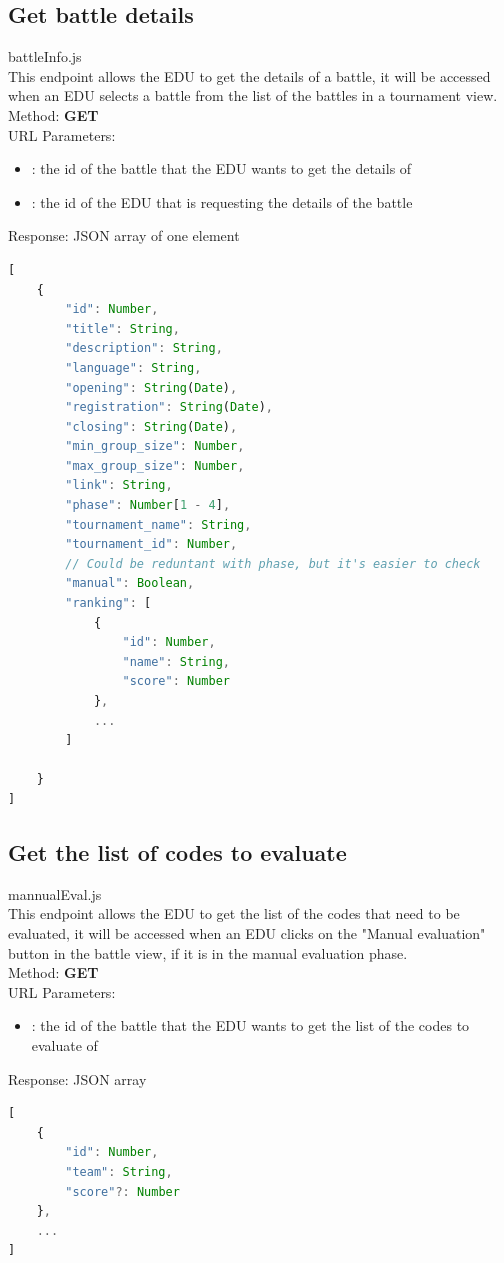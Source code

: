 \subsection{Get battle details}
battleInfo.js\\
This endpoint allows the EDU to get the details of a battle, it will be accessed when an EDU selects a battle from the list of the battles in a tournament view.\\

Method: \textbf{GET}\\
URL Parameters:
\begin{itemize}
    \item {}: the id of the battle that the EDU wants to get the details of
    \item {}: the id of the EDU that is requesting the details of the battle
\end{itemize}
Response: JSON array of one element
\begin{lstlisting}[language=JavaScript, label={lst:jscode}, basicstyle=\ttfamily]
[
    {
        "id": Number,
        "title": String,
        "description": String,
        "language": String,
        "opening": String(Date),
        "registration": String(Date),
        "closing": String(Date),
        "min_group_size": Number,
        "max_group_size": Number,
        "link": String,
        "phase": Number[1 - 4],
        "tournament_name": String,
        "tournament_id": Number,
        // Could be reduntant with phase, but it's easier to check
        "manual": Boolean,
        "ranking": [
            {
                "id": Number,
                "name": String,
                "score": Number
            },
            ...
        ]

    }
]
\end{lstlisting}

\subsection{Get the list of codes to evaluate}
mannualEval.js\\
This endpoint allows the EDU to get the list of the codes that need to be evaluated, it will be accessed when an EDU clicks on the "Manual evaluation" button in the battle view, if it is in the manual evaluation phase.\\

Method: \textbf{GET}\\
URL Parameters:
\begin{itemize}
    \item {}: the id of the battle that the EDU wants to get the list of the codes to evaluate of
\end{itemize}
Response: JSON array
\begin{lstlisting}[language=JavaScript, label={lst:jscode}, basicstyle=\ttfamily]
[
    {
        "id": Number,
        "team": String,
        "score"?: Number
    },
    ...
]
\end{lstlisting}


